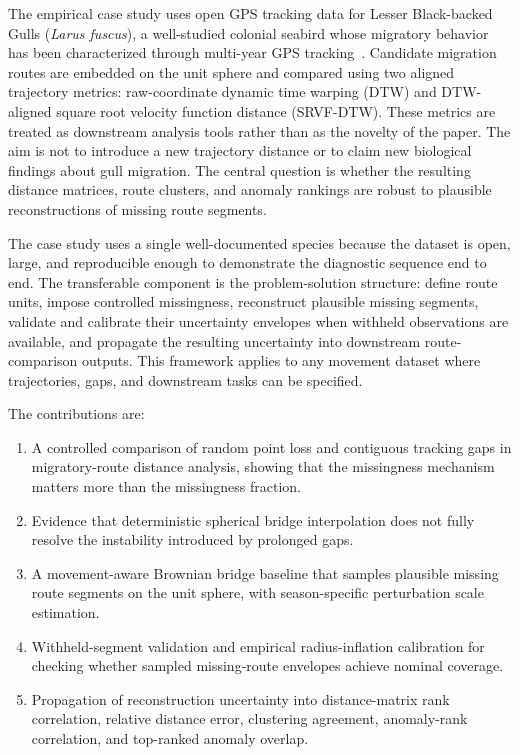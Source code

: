 \documentclass[pdflatex,sn-vancouver-num]{sn-jnl}
\providecommand{\tightlist}{%
  \setlength{\itemsep}{0pt}\setlength{\parskip}{0pt}}
\begin{document}
The empirical case study uses open GPS tracking data for Lesser Black-backed Gulls (\emph{Larus fuscus}), a well-studied colonial seabird whose migratory behavior has been characterized through multi-year GPS tracking~\cite{kavelaars2020,brown2023,baert2022}. Candidate migration routes are embedded on the unit sphere and compared using two aligned trajectory metrics: raw-coordinate dynamic time warping (DTW) and DTW-aligned square root velocity function distance (SRVF-DTW). These metrics are treated as downstream analysis tools rather than as the novelty of the paper. The aim is not to introduce a new trajectory distance or to claim new biological findings about gull migration. The central question is whether the resulting distance matrices, route clusters, and anomaly rankings are robust to plausible reconstructions of missing route segments.

The case study uses a single well-documented species because the dataset is open, large, and reproducible enough to demonstrate the diagnostic sequence end to end. The transferable component is the problem-solution structure: define route units, impose controlled missingness, reconstruct plausible missing segments, validate and calibrate their uncertainty envelopes when withheld observations are available, and propagate the resulting uncertainty into downstream route-comparison outputs. This framework applies to any movement dataset where trajectories, gaps, and downstream tasks can be specified.

The contributions are:

\begin{enumerate}
\def\labelenumi{\arabic{enumi}.}
\tightlist
\item A controlled comparison of random point loss and contiguous tracking gaps in migratory-route distance analysis, showing that the missingness mechanism matters more than the missingness fraction.
\item Evidence that deterministic spherical bridge interpolation does not fully resolve the instability introduced by prolonged gaps.
\item A movement-aware Brownian bridge baseline that samples plausible missing route segments on the unit sphere, with season-specific perturbation scale estimation.
\item Withheld-segment validation and empirical radius-inflation calibration for checking whether sampled missing-route envelopes achieve nominal coverage.
\item Propagation of reconstruction uncertainty into distance-matrix rank correlation, relative distance error, clustering agreement, anomaly-rank correlation, and top-ranked anomaly overlap.
\end{enumerate}
\end{document}
